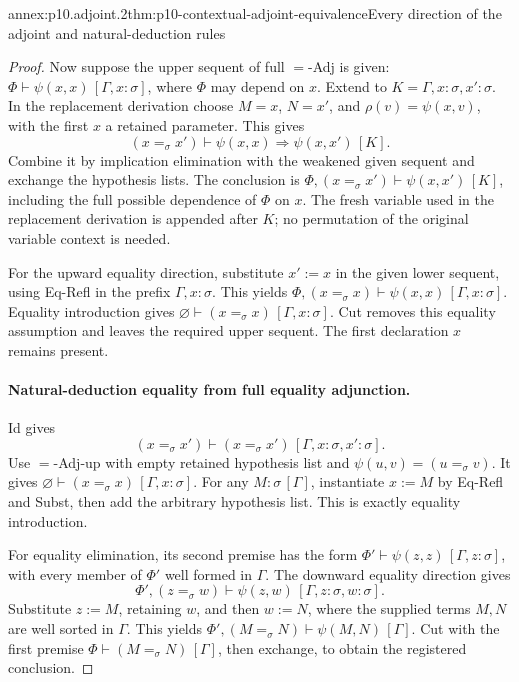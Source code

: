 \begin{annexitem}{annex:p10.adjoint.2}{thm:p10-contextual-adjoint-equivalence}{Every direction of the adjoint and natural-deduction rules}
\begin{proof}
Now suppose the upper sequent of full \(=\)-Adj is given:
\(\Phi\vdash\psi(x,x)\,[\Gamma,x:\sigma]\), where \(\Phi\)
may depend on \(x\). Extend to
\(K=\Gamma,x:\sigma,x':\sigma\).
In the replacement derivation choose \(M=x\), \(N=x'\), and
\(\rho(v)=\psi(x,v)\), with the first \(x\) a retained parameter.
This gives
\[
 (x=_\sigma x')\vdash
            \psi(x,x)\Rightarrow\psi(x,x')\,[K].
\]
Combine it by implication elimination with the weakened given
sequent and exchange the hypothesis lists. The conclusion is
\(\Phi,(x=_\sigma x')\vdash\psi(x,x')\,[K]\), including the
full possible dependence of \(\Phi\) on \(x\).
The fresh variable used in the replacement derivation is appended
after \(K\); no permutation of the original variable context
is needed.

For the upward equality direction, substitute \(x':=x\) in
the given lower sequent, using Eq-Refl in the prefix
\(\Gamma,x:\sigma\). This yields
\(\Phi,(x=_\sigma x)\vdash\psi(x,x)\,[\Gamma,x:\sigma]\).
Equality introduction gives
\(\varnothing\vdash(x=_\sigma x)\,[\Gamma,x:\sigma]\).
Cut removes this equality assumption and leaves the required
upper sequent. The first declaration \(x\) remains present.

\paragraph{Natural-deduction equality from full equality adjunction.}
Id gives
\[
 (x=_\sigma x')\vdash(x=_\sigma x')\,[\Gamma,x:\sigma,x':\sigma].
\]
Use \(=\)-Adj-up with empty retained hypothesis list and
\(\psi(u,v)=(u=_\sigma v)\).
It gives \(\varnothing\vdash(x=_\sigma x)\,[\Gamma,x:\sigma]\).
For any \(M:\sigma\,[\Gamma]\), instantiate \(x:=M\)
by Eq-Refl and Subst, then add the arbitrary hypothesis list.
This is exactly equality introduction.

For equality elimination, its second premise has the form
\(\Phi'\vdash\psi(z,z)\,[\Gamma,z:\sigma]\), with every
member of \(\Phi'\) well formed in \(\Gamma\).
The downward equality direction gives
\[
 \Phi',(z=_\sigma w)\vdash\psi(z,w)\,[\Gamma,z:\sigma,w:\sigma].
\]
Substitute \(z:=M\), retaining \(w\), and then \(w:=N\),
where the supplied terms \(M,N\) are well sorted in \(\Gamma\).
This yields \(\Phi',(M=_\sigma N)\vdash\psi(M,N)\,[\Gamma]\).
Cut with the first premise
\(\Phi\vdash(M=_\sigma N)\,[\Gamma]\), then exchange,
to obtain the registered conclusion.


\end{proof}
\end{annexitem}
